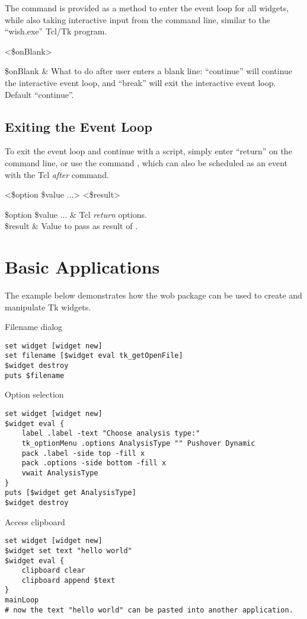 \documentclass{article}
\renewcommand{\^}[1]{\textsuperscript{#1}}
\renewcommand{\_}[1]{\textsubscript{#1}}
\begin{document}
The command  is provided as a method to enter the event loop for all widgets, while also taking interactive input from the command line, similar to the ``wish.exe'' Tcl/Tk program.
\begin{syntax}
   	 <\$onBlank>
\end{syntax}
\begin{args}
   	\$onBlank & What to do after user enters a blank line: ``continue'' will continue the interactive event loop, and ``break'' will exit the interactive event loop. Default ``continue''.
\end{args}

\subsection{Exiting the Event Loop}
To exit the event loop and continue with a script, simply enter ``return'' on the command line, or use the command , which can also be scheduled as an event with the Tcl \textit{after} command.
\begin{syntax}
 <\$option \$value ...> <\$result>
\end{syntax}
\begin{args}
\$option \$value ... & Tcl \textit{return} options. \\
\$result & Value to pass as result of .
\end{args}

\clearpage
\section{Basic Applications}
The example below demonstrates how the wob package can be used to create and manipulate Tk widgets.
\begin{example}{Filename dialog}
\begin{lstlisting}
set widget [widget new]
set filename [$widget eval tk_getOpenFile]
$widget destroy
puts $filename
\end{lstlisting}
\end{example}

\begin{example}{Option selection}
\begin{lstlisting}
set widget [widget new]
$widget eval {
	label .label -text "Choose analysis type:"
	tk_optionMenu .options AnalysisType "" Pushover Dynamic
	pack .label -side top -fill x
	pack .options -side bottom -fill x
	vwait AnalysisType
}
puts [$widget get AnalysisType]
$widget destroy
\end{lstlisting}
\end{example}

\begin{example}{Access clipboard}
\begin{lstlisting}
set widget [widget new]
$widget set text "hello world"
$widget eval {
	clipboard clear
	clipboard append $text
}
mainLoop
# now the text "hello world" can be pasted into another application.
\end{lstlisting}
\end{example}
\end{document}
